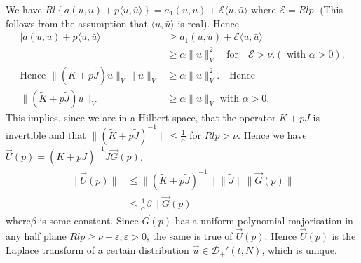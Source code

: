 \noindent We have $Rl \left\{ a(u, u)+ p \langle u, \bar{u} \rangle
\right\}= a_1 (u, u) + \mathscr{E} \langle u, \bar{u} \rangle$ where
$\mathscr{E}= Rl p$. (This follows from the assumption that $\langle
u, \bar{u} \rangle$ is real). Hence
\begin{align*}
\left|a(u, u) + p \langle u, \bar{u}\rangle \right| &\geq a_1 (u, u)
+ \mathscr{E} \langle u, \bar{u}\rangle\\
&\geq \alpha \parallel u \parallel_V^2 \quad \text{for} \quad
\mathscr{E} > \nu.  (\text{ with } \alpha > 0).\\
\text{Hence } \parallel (\tilde{K}+p\tilde{J})
u\parallel_V \parallel u \parallel_V &\geq \alpha \parallel u
\parallel_V^2. \quad \text{Hence} \\
\parallel (\tilde{K} + p \tilde{J}) u \parallel_V &\geq \alpha
\parallel u \parallel_V \text{ with }  \alpha > 0.  
\end{align*}
This implies, since we are in a Hilbert space, that the operator
$\tilde{K}+p\tilde{J}$ is invertible and that $\parallel (\tilde{K} +
p\tilde{J})^{-1} \parallel \leq \frac{1}{\alpha}$ for $Rl p >
\nu$. Hence we have $\overrightarrow{U} (p) = (\tilde{K} +
p\tilde{J})^{-1} \tilde{J} \overrightarrow{G} (p)$.
\begin{align*}
\parallel \overrightarrow{U} (p) \parallel &\leq \parallel (\tilde{K}
+ p\tilde{J})^{-1} \parallel \parallel \tilde{J}\parallel
\parallel\overrightarrow{G} (p)\parallel\\
&\leq \frac{1}{\alpha} \beta 
\parallel \overrightarrow{G} (p)\parallel
\end{align*}
where\pageoriginale $\beta$ is some constant. Since
$\overrightarrow{G} (p)$ has a uniform polynomial majorisation in any
half plane $Rl p \geq \nu + \varepsilon, \varepsilon > 0$, the same is
true of $\overrightarrow{U} (p)$. Hence $\overrightarrow{U}(p)$ is the
Laplace transform of a certain distribution $\overrightarrow{u} \in
\mathscr{D}_+' (t, N)$, which is unique.

